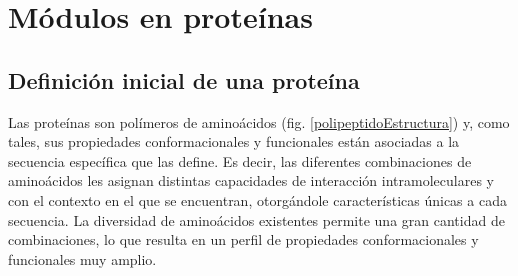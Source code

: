 \section{Módulos en proteínas}
\label{proteinLandscape}
% 

\subsection{Definición inicial de una proteína}
Las proteínas son polímeros de aminoácidos (fig. \ref{polipeptidoEstructura}) y, como tales, sus propiedades conformacionales y funcionales están asociadas a la secuencia específica que las define.
Es decir, las diferentes combinaciones de aminoácidos les asignan distintas capacidades de interacción intramoleculares y con el contexto en el que se encuentran, otorgándole características únicas a cada secuencia.
La diversidad de aminoácidos existentes permite una gran cantidad de combinaciones, lo que resulta en un perfil de propiedades conformacionales y funcionales muy amplio.

